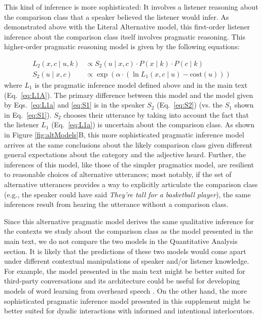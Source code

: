 \documentclass[doc]{apa6}
\begin{document}
This kind of inference is more sophisticated: It involves a listener reasoning about the comparison class that a speaker believed the listener would infer.
As demonstrated above with the Literal Alternative model, this first-order listener inference about the comparison class itself involves pragmatic reasoning. 
This higher-order pragmatic reasoning model is given by the following equations:

\begin{align}
L_2(x, c \mid u, k) &\propto S_2(u \mid x, c) \cdot P(x \mid k) \cdot P(c \mid k) \label{eq:L2} \\
S_2(u \mid x, c) &\propto \exp{(\alpha \cdot (\ln L_{1}(x, c \mid u) - \text{cost}(u) ))}\label{eq:S2} 
\end{align}
%
where $L_1$ is the pragmatic inference model defined above and in the main text (Eq.~\ref{eq:L1A}).
The primary difference between this model and the model given by Eqs.~\ref{eq:L1a} and \ref{eq:S1} is in the speaker $S_2$ (Eq.~\ref{eq:S2}) (vs. the $S_1$ shown in Eq.~\ref{eq:S1}).
$S_2$ chooses their utterance by taking into account the fact that the listener $L_1$ (Eq.~\ref{eq:L1a}) is uncertain about the comparison class. 
As shown in Figure \ref{fig:altModels}B, this more sophisticated pragmatic inference model arrives at the same conclusions about the likely comparison class given different general expectations about the category and the adjective heard.
Further, the inferences of this model, like those of the simpler pragmatics model, are resilient to reasonable choices of alternative utterances; most notably, if the set of alternative utterances provides a way to explicitly articulate the comparison class (e.g., the speaker could have said \emph{They're tall for a basketball player}), the same inferences result from hearing the utterance without a comparison class.

Since this alternative pragmatic model derives the same qualitative inference for the contexts we study about the comparison class as the model presented in the main text, we do not compare the two models in the Quantitative Analysis section. It is likely that the predictions of these two models would come apart under different contextual manipulations of speaker and/or listener knowledge. For example, the model presented in the main text might be better suited for third-party conversations and its architecture could be useful for developing models of word learning from overheard speech \cite{akhtar2001learning, martinez2011orienting}. On the other hand, the more sophisticated pragmatic inference model presented in this supplement might be better suited for dyadic interactions with informed and intentional interlocutors. 
%
%
%
\end{document}
